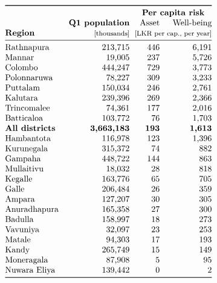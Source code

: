 \documentclass[10pt]{article}
\begin{document}
\[\begin{tabular}{@{}lrrr@{}}
\toprule
& & \multicolumn{2}{c}{\bf Per capita risk}\\
{} &  \bf Q1 population &  Asset &  Well-being \\
\bf Region  & \footnotesize [thousands]  &  \multicolumn{2}{@{}c@{}}{\footnotesize [LKR per cap., per year]}\\
\midrule
Rathnapura   &   213,715 &         446 &       6,191 \\
Mannar       &    19,005 &         237 &       5,726 \\
Colombo      &   444,247 &         729 &       3,773 \\
Polonnaruwa  &    78,227 &         309 &       3,233 \\
Puttalam     &   150,034 &         246 &       2,761 \\
Kalutara     &   239,396 &         269 &       2,366 \\
Trincomalee  &    74,361 &         177 &       2,016 \\
Batticaloa   &   103,772 &          76 &       1,703 \\
\bf{All districts} & \bf{3,663,183}&\bf{193}&\bf{1,613}\\
Hambantota   &   116,978 &         123 &       1,396 \\
Kurunegala   &   315,372 &          74 &         882 \\
Gampaha      &   448,722 &         144 &         863 \\
Mullaitivu   &    18,032 &          28 &         818 \\
Kegalle      &   163,776 &          65 &         705 \\
Galle        &   206,484 &          26 &         359 \\
Ampara       &   127,207 &          30 &         305 \\
Anuradhapura &   165,358 &          27 &         300 \\
Badulla      &   158,997 &          18 &         273 \\
Vavuniya     &    32,097 &          23 &         253 \\
Matale       &    94,303 &          17 &         193 \\
Kandy        &   265,749 &          15 &         149 \\
Moneragala   &    87,908 &           5 &          95 \\
Nuwara Eliya &   139,442 &           0 &           2 \\
\bottomrule
\end{tabular}
\]
\end{document}
